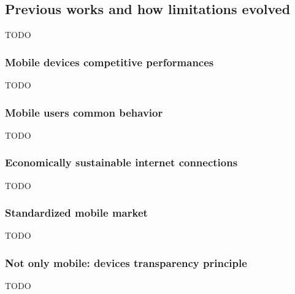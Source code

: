 \subsection{Previous works and how limitations evolved}
TODO

\subsubsection{Mobile devices competitive performances}
TODO

\subsubsection{Mobile users common behavior}
TODO

\subsubsection{Economically sustainable internet connections}
TODO

\subsubsection{Standardized mobile market}
TODO

\subsubsection{Not only mobile: devices transparency principle}
TODO
